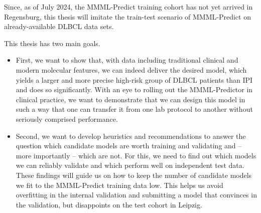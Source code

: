 Since, as of July 2024, the MMML-Predict training cohort has not yet arrived in Regensburg, this thesis
will imitate the train-test scenario of MMML-Predict on already-available DLBCL data sets. 

This thesis has two main goals.
\begin{itemize}
\item First, we want to show that, with data including traditional clinical and modern 
molecular features, we can indeed deliver 
the desired model, which yields a larger and more precise high-risk group of DLBCL patients than 
IPI and does so significantly. With an eye to rolling out the MMML-Predictor in clinical practice, 
we want to demonstrate that we can design this model in such a way that one can transfer it from 
one lab protocol to another without seriously comprised performance.
\item Second, we want to develop heuristics and recommendations to answer the question which candidate 
models are worth training and validating and -- more importantly -- which are not. For this, we 
need to find out which models we can reliably validate 
and which perform well on independent test data. These findings will guide us on how to keep 
the number of candidate models we fit to the MMML-Predict training data low. This helps
us avoid overfitting in the internal validation and submitting a model that convinces 
in the validation, but disappoints on the test cohort in Leipzig.
\end{itemize}